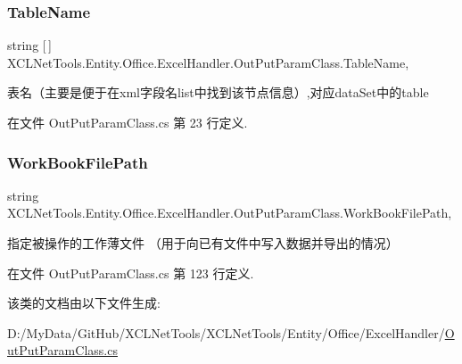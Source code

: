\subsubsection{\texorpdfstring{Table\+Name}{TableName}}
{\footnotesize\ttfamily string \mbox{[}$\,$\mbox{]} X\+C\+L\+Net\+Tools.\+Entity.\+Office.\+Excel\+Handler.\+Out\+Put\+Param\+Class.\+Table\+Name\hspace{0.3cm}{\ttfamily [get]}, {\ttfamily [set]}}



表名（主要是便于在xml字段名list中找到该节点信息）,对应data\+Set中的table 



在文件 Out\+Put\+Param\+Class.\+cs 第 23 行定义.

\mbox{\label{class_x_c_l_net_tools_1_1_entity_1_1_office_1_1_excel_handler_1_1_out_put_param_class_a5b29724ec341728c000b509ec1a5e5bc}} 
\subsubsection{\texorpdfstring{Work\+Book\+File\+Path}{WorkBookFilePath}}
{\footnotesize\ttfamily string X\+C\+L\+Net\+Tools.\+Entity.\+Office.\+Excel\+Handler.\+Out\+Put\+Param\+Class.\+Work\+Book\+File\+Path\hspace{0.3cm}{\ttfamily [get]}, {\ttfamily [set]}}



指定被操作的工作薄文件 （用于向已有文件中写入数据并导出的情况） 



在文件 Out\+Put\+Param\+Class.\+cs 第 123 行定义.



该类的文档由以下文件生成\+:\begin{DoxyCompactItemize}
\item 
D\+:/\+My\+Data/\+Git\+Hub/\+X\+C\+L\+Net\+Tools/\+X\+C\+L\+Net\+Tools/\+Entity/\+Office/\+Excel\+Handler/\hyperlink{_out_put_param_class_8cs}{Out\+Put\+Param\+Class.\+cs}\end{DoxyCompactItemize}
